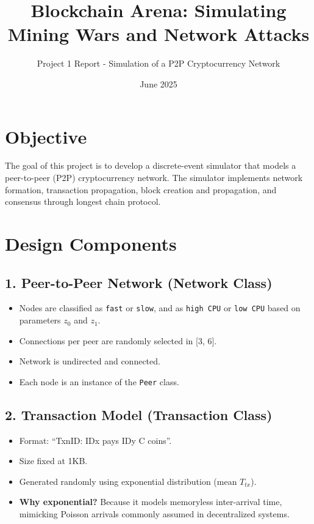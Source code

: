 \documentclass[11pt]{article}
\title{\textbf{Blockchain Arena: Simulating Mining Wars and Network Attacks}}
\author{Project 1 Report - Simulation of a P2P Cryptocurrency Network}
\date{June 2025}
\begin{document}
\maketitle

\section*{Objective}
The goal of this project is to develop a discrete-event simulator that models a peer-to-peer (P2P) cryptocurrency network. The simulator implements network formation, transaction propagation, block creation and propagation, and consensus through longest chain protocol.

\section*{Design Components}

\subsection*{1. Peer-to-Peer Network (Network Class)}
\begin{itemize}
  \item Nodes are classified as \texttt{fast} or \texttt{slow}, and as \texttt{high CPU} or \texttt{low CPU} based on parameters $z_0$ and $z_1$.
  \item Connections per peer are randomly selected in [3, 6].
  \item Network is undirected and connected.
  \item Each node is an instance of the \texttt{Peer} class.
\end{itemize}

\subsection*{2. Transaction Model (Transaction Class)}
\begin{itemize}
  \item Format: ``TxnID: IDx pays IDy C coins''.
  \item Size fixed at 1KB.
  \item Generated randomly using exponential distribution (mean $T_{tx}$).
  \item \textbf{Why exponential?} Because it models memoryless inter-arrival time, mimicking Poisson arrivals commonly assumed in decentralized systems.
\end{itemize}
\end{document}

